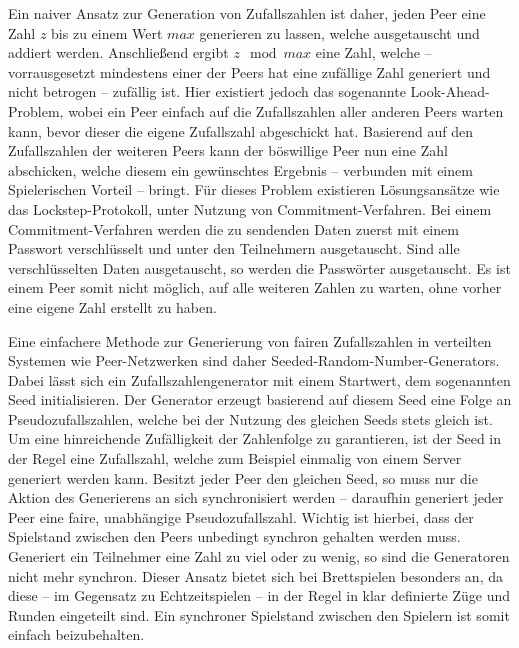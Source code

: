 Ein naiver Ansatz zur Generation von Zufallszahlen ist daher, jeden Peer eine Zahl $z$ bis zu einem Wert $max$ generieren zu lassen, welche ausgetauscht und addiert werden. Anschließend ergibt $z \mod max$ eine Zahl, welche -- vorrausgesetzt mindestens einer der Peers hat eine zufällige Zahl generiert und nicht betrogen -- zufällig ist. Hier existiert jedoch das sogenannte \glqq{}Look-Ahead-Problem\grqq{}, wobei ein Peer einfach auf die Zufallszahlen aller anderen Peers warten kann, bevor dieser die eigene Zufallszahl abgeschickt hat. Basierend auf den Zufallszahlen der weiteren Peers kann der böswillige Peer nun eine Zahl abschicken, welche diesem ein gewünschtes Ergebnis -- verbunden mit einem Spielerischen Vorteil -- bringt. Für dieses Problem existieren Lösungsansätze wie das \glqq{}Lockstep-Protokoll\grqq{}, unter Nutzung von Commitment-Verfahren. Bei einem Commitment-Verfahren werden die zu sendenden Daten zuerst mit einem Passwort verschlüsselt und unter den Teilnehmern ausgetauscht. Sind alle verschlüsselten Daten ausgetauscht, so werden die Passwörter ausgetauscht. Es ist einem Peer somit nicht möglich, auf alle weiteren Zahlen zu warten, ohne vorher eine eigene Zahl erstellt zu haben.\par

Eine einfachere Methode zur Generierung von fairen Zufallszahlen in verteilten Systemen wie Peer-Netzwerken sind daher \glqq{}Seeded-Random-Number-Generators\grqq{}. Dabei lässt sich ein Zufallszahlengenerator mit einem Startwert, dem sogenannten \glqq{}Seed\grqq{} initialisieren. Der Generator erzeugt basierend auf diesem Seed eine Folge an Pseudozufallszahlen, welche bei der Nutzung des gleichen Seeds stets gleich ist. Um eine hinreichende Zufälligkeit der Zahlenfolge zu garantieren, ist der Seed in der Regel eine Zufallszahl, welche zum Beispiel einmalig von einem Server generiert werden kann. Besitzt jeder Peer den gleichen Seed, so muss nur die Aktion des Generierens an sich synchronisiert werden -- daraufhin generiert jeder Peer eine faire, unabhängige Pseudozufallszahl. Wichtig ist hierbei, dass der Spielstand zwischen den Peers unbedingt synchron gehalten werden muss. Generiert ein Teilnehmer eine Zahl zu viel oder zu wenig, so sind die Generatoren nicht mehr synchron. Dieser Ansatz bietet sich bei Brettspielen besonders an, da diese -- im Gegensatz zu Echtzeitspielen -- in der Regel in klar definierte \glqq{}Züge\grqq{} und \glqq{}Runden\grqq{} eingeteilt sind. Ein synchroner Spielstand zwischen den Spielern ist somit einfach beizubehalten.\par